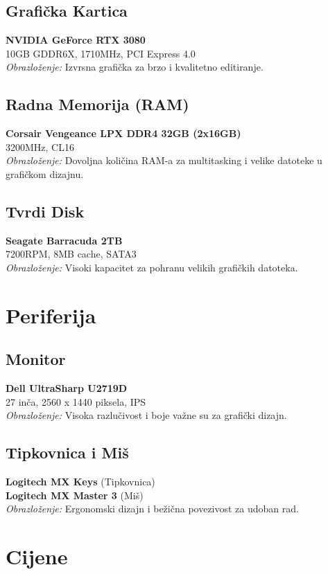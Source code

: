 \documentclass{article}
\begin{document}
\subsection*{Grafička Kartica}
\textbf{NVIDIA GeForce RTX 3080} \\
10GB GDDR6X, 1710MHz, PCI Express 4.0 \\
\textit{Obrazloženje:} Izvrsna grafička za brzo i kvalitetno editiranje.

\subsection*{Radna Memorija (RAM)}
\textbf{Corsair Vengeance LPX DDR4 32GB (2x16GB)} \\
3200MHz, CL16 \\
\textit{Obrazloženje:} Dovoljna količina RAM-a za multitasking i velike datoteke u grafičkom dizajnu.

\subsection*{Tvrdi Disk}
\textbf{Seagate Barracuda 2TB} \\
7200RPM, 8MB cache, SATA3 \\
\textit{Obrazloženje:} Visoki kapacitet za pohranu velikih grafičkih datoteka.

\section*{Periferija}

\subsection*{Monitor}
\textbf{Dell UltraSharp U2719D} \\
27 inča, 2560 x 1440 piksela, IPS \\
\textit{Obrazloženje:} Visoka razlučivost i boje važne su za grafički dizajn.

\subsection*{Tipkovnica i Miš}
\textbf{Logitech MX Keys} (Tipkovnica) \\
\textbf{Logitech MX Master 3} (Miš) \\
\textit{Obrazloženje:} Ergonomski dizajn i bežična povezivost za udoban rad.

\section*{Cijene}
\end{document}
